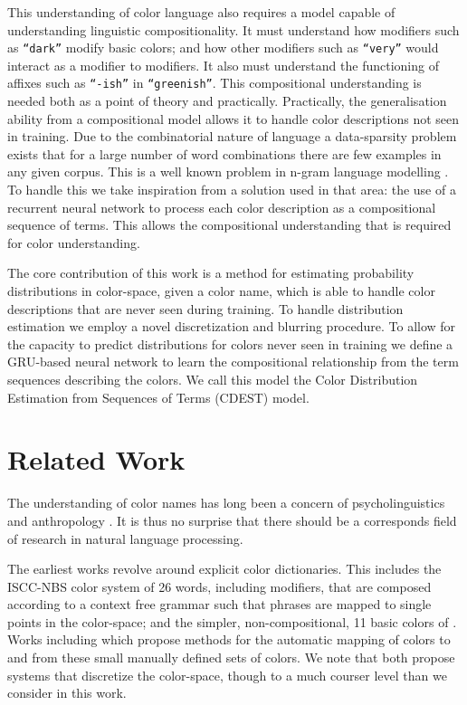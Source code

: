 \documentclass[11pt,a4paper]{article}
\newcommand{\parencite}{\citep}
\newcommand{\textcite}{\citet}
\begin{document}
This understanding of color language also requires a model capable of understanding linguistic compositionality.
It must understand how modifiers such as \texttt{``dark''} modify basic colors; and  how other modifiers such as \texttt{``very''} would interact as a modifier to modifiers.
It also must understand the functioning of affixes such as \texttt{``-ish''} in \texttt{``greenish''}.
This compositional understanding is needed both as a point of theory and practically.
Practically, the generalisation ability from a compositional model allows it to handle color descriptions not seen in training.
Due to the combinatorial nature of language a data-sparsity problem exists that
for a large number of word combinations there are few examples in any given corpus.
This is a well known problem in n-gram language modelling \parencite{kneser1995improved,chen1996empirical,rosenfeld2000two}.
To handle this we take inspiration from a solution used in that area: the use of a recurrent neural network \parencite{mikolov2011RnnLM} to process each color description as a compositional sequence of terms.
This allows the compositional understanding that is required for color understanding.


The core contribution of this work is a method for estimating probability distributions in color-space, given a color name,
 which is able to handle color descriptions that are never seen during training.
To handle distribution estimation we employ a novel discretization and blurring procedure.
To allow for the capacity to predict distributions for colors never seen in training we define a GRU-based neural network to learn the compositional relationship from the term sequences describing the colors.
We call this model the Color Distribution Estimation from Sequences of Terms (CDEST) model.


\section{Related Work}\label{sec:related-work}
The understanding of color names has long been a concern of psycholinguistics and anthropology  \parencite{berlin1969basic,heider1972universals,HEIDER1972337,mylonas2015use}.
It is thus no surprise that there should be a corresponds field of research in natural language processing.

The earliest works revolve around explicit color dictionaries.
This includes the ISCC-NBS color system \parencite{kelly1955iscc} of 26 words, including modifiers, that are composed according to a context free grammar such that phrases are mapped to single points in the color-space;
and the simpler, non-compositional, 11 basic colors of \textcite{berlin1969basic}.
Works including \textcite{Berk:1982:HFS:358589.358606,conway1992experimental, mojsilovic2005computational, ele1994computational, menegaz2007discrete,van2009learning} which propose methods for the automatic mapping of colors to and from these small manually defined sets of colors.
We note that \textcite{menegaz2007discrete,van2009learning} both propose systems that discretize the color-space, though to a much courser level than we consider in this work.
\end{document}

